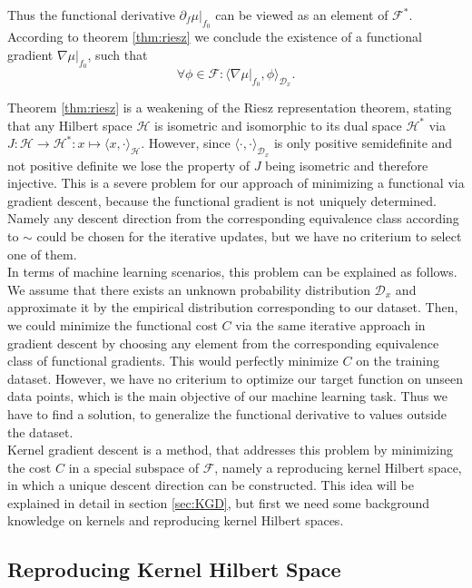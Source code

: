 \documentclass[11pt, a4paper]{article}
\newcommand{\D}{\mathcal{D}}
\newcommand{\F}{\mathcal{F}}
\renewcommand{\H}{\mathcal{H}}
\begin{document}
Thus the functional derivative $\partial_f \mu |_{f_0}$ can be viewed as an element of $\F^*$. According to theorem \ref{thm:riesz} we conclude the existence of a functional gradient $\nabla \mu |_{f_0}$, such that
\[ \forall \phi \in \F: \big \langle \nabla \mu |_{f_0}, \phi \big \rangle_{\D_x}. \]

Theorem \ref{thm:riesz} is a weakening of the Riesz representation theorem, stating that any Hilbert space $\H$ is isometric and isomorphic to its dual space $\H^*$ via  $J:\H \to \H^* : x \mapsto \langle x , \cdot \rangle_\H$. However, since $\langle \cdot , \cdot \rangle_{\D_x}$ is only positive semidefinite and not positive definite we lose the property of $J$ being isometric and therefore injective. This is a severe problem for our approach of minimizing a functional via gradient descent, because the functional gradient is not uniquely determined. Namely any descent direction from the corresponding equivalence class according to $\sim$ could be chosen for the iterative updates, but we have no criterium to select one of them. \\

In terms of machine learning scenarios, this problem can be explained as follows. We assume that there exists an unknown probability distribution $\D_x$ and approximate it by the empirical distribution corresponding to our dataset. Then, we could minimize the functional cost $C$ via the same iterative approach in gradient descent by choosing any element from the corresponding equivalence class of functional gradients. This would perfectly minimize $C$ on the training dataset. However, we have no criterium to optimize our target function on unseen data points, which is the main objective of our machine learning task. Thus we have to find a solution, to generalize the functional derivative to values outside the dataset.  \\

Kernel gradient descent is a method, that addresses this problem by minimizing the cost $C$ in a special subspace of $\F$, namely a reproducing kernel Hilbert space, in which a unique descent direction can be constructed. This idea will be explained in detail in section \ref{sec:KGD}, but first we need some background knowledge on kernels and reproducing kernel Hilbert spaces. 

\subsection{Reproducing Kernel Hilbert Space}
\end{document}
